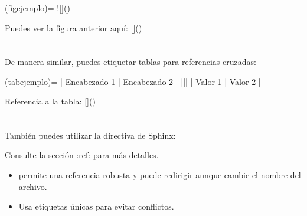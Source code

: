 \documentclass[a4paper,10pt,spanish]{sphinxmanual}
\begin{document}
\begin{sphinxVerbatim}[commandchars=\\\{\}]
(fig\PYGZhy{}ejemplo)=
![]()

Puedes ver la figura anterior aquí: []()
\end{sphinxVerbatim}


\bigskip\hrule\bigskip



\subsubsection{}
\label{\detokenize{configuracion_inicial/013.guia_de_myst_parser:referencias-a-tablas}}
\sphinxAtStartPar
De manera similar, puedes etiquetar tablas para referencias cruzadas:

\begin{sphinxVerbatim}[commandchars=\\\{\}]
(tab\PYGZhy{}ejemplo)=
| Encabezado 1 | Encabezado 2 |
|\PYGZhy{}\PYGZhy{}\PYGZhy{}\PYGZhy{}\PYGZhy{}\PYGZhy{}\PYGZhy{}\PYGZhy{}\PYGZhy{}\PYGZhy{}\PYGZhy{}\PYGZhy{}\PYGZhy{}|\PYGZhy{}\PYGZhy{}\PYGZhy{}\PYGZhy{}\PYGZhy{}\PYGZhy{}\PYGZhy{}\PYGZhy{}\PYGZhy{}\PYGZhy{}\PYGZhy{}\PYGZhy{}\PYGZhy{}|
| Valor 1    | Valor 2    |

Referencia a la tabla: []()
\end{sphinxVerbatim}


\bigskip\hrule\bigskip



\subsubsection{}
\label{\detokenize{configuracion_inicial/013.guia_de_myst_parser:referencias-con-la-directiva-ref}}
\sphinxAtStartPar
También puedes utilizar la directiva  de Sphinx:

\begin{sphinxVerbatim}[commandchars=\\\{\}]
Consulte la sección :ref:  para más detalles.
\end{sphinxVerbatim}
\begin{itemize}
\item {} 
\sphinxAtStartPar
{} permite una referencia robusta y puede redirigir aunque cambie el nombre del archivo.

\item {} 
\sphinxAtStartPar
Usa etiquetas únicas para evitar conflictos.

\end{itemize}
\end{document}
